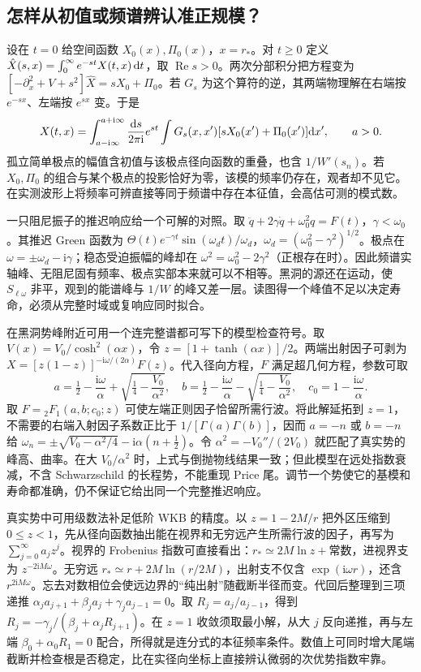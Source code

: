 \subsection{怎样从初值或频谱辨认准正规模？}

设在 $t=0$ 给空间函数 $X_0(x),\Pi_0(x)$，$x=r_*$。对 $t\ge0$ 定义 $\hat X(s,x)=\int_0^\infty e^{-st}X(t,x)\,\dd t$，取 $\operatorname{Re}s>0$。两次分部积分把方程变为 $[-\partial_x^2+V+s^2]\hat X=sX_0+\Pi_0$。若 $G_s$ 为这个算符的逆，其两端物理解在右端按 $e^{-s x}$、左端按 $e^{s x}$ 变。于是
\[
 X(t,x)=\int_{a-\mathrm i\infty}^{a+\mathrm i\infty}
 \frac{\dd s}{2\pi\mathrm i}e^{st}
 \int G_s(x,x')[sX_0(x')+\Pi_0(x')]\dd x',\qquad a>0 .
\]
孤立简单极点的幅值含初值与该极点径向函数的重叠，也含 $1/W'(s_n)$。若 $X_0,\Pi_0$ 的组合与某个极点的投影恰好为零，该模的频率仍存在，观者却不见它。在实测波形上将频率可辨直接等同于频谱中存在本征值，会高估可测的模式数。

一只阻尼振子的推迟响应给一个可解的对照。取 $\ddot q+2\gamma\dot q+\omega_0^2 q=F(t)$，$\gamma<\omega_0$。其推迟 Green 函数为 $\Theta(t)e^{-\gamma t}\sin(\omega_d t)/\omega_d$，$\omega_d=(\omega_0^2-\gamma^2)^{1/2}$。极点在 $\omega=\pm\omega_d-\mathrm i\gamma$；稳态受迫振幅的峰却在 $\omega^2=\omega_0^2-2\gamma^2$（正根存在时）。因此频谱实轴峰、无阻尼固有频率、极点实部本来就可以不相等。黑洞的源还在运动，使 $S_{\ell\omega}$ 非平，观到的能谱峰与 $1/W$ 的峰又差一层。读图得一个峰值不足以决定寿命，必须从完整时域或复响应同时拟合。

在黑洞势峰附近可用一个连完整谱都可写下的模型检查符号。取 $V(x)=V_0/\cosh^2(\alpha x)$，令 $z=[1+\tanh(\alpha x)]/2$。两端出射因子可剥为 $X=[z(1-z)]^{-\mathrm i\omega/(2\alpha)}F(z)$。代入径向方程，$F$ 满足超几何方程，参数可取
\[
 a=\tfrac12-\frac{\mathrm i\omega}{\alpha}
               +\sqrt{\tfrac14-\frac{V_0}{\alpha^2}},\quad
 b=\tfrac12-\frac{\mathrm i\omega}{\alpha}
               -\sqrt{\tfrac14-\frac{V_0}{\alpha^2}},\quad
 c_0=1-\frac{\mathrm i\omega}{\alpha}.
\]
取 $F={}_2F_1(a,b;c_0;z)$ 可使左端正则因子恰留所需行波。将此解延拓到 $z=1$，不需要的右端入射因子系数正比于 $1/[\Gamma(a)\Gamma(b)]$，因而 $a=-n$ 或 $b=-n$ 给 $\omega_n=\pm\sqrt{V_0-\alpha^2/4}-\mathrm i\alpha(n+\tfrac12)$。令 $\alpha^2=-V_0''/(2V_0)$ 就匹配了真实势的峰高、曲率。在大 $V_0/\alpha^2$ 时，上式与倒抛物线结果一致；但此模型在远处指数衰减，不含 Schwarzschild 的长程势，不能重现 Price 尾。调节一个势使它的基模和寿命都准确，仍不保证它给出同一个完整推迟响应。

真实势中可用级数法补足低阶 WKB 的精度。以 $z=1-2M/r$ 把外区压缩到 $0\le z<1$，先从径向函数抽出能在视界和无穷远产生所需行波的因子，再写为 $\sum_{j=0}^\infty a_j z^j$。视界的 Frobenius 指数可直接看出：$r_*\simeq2M\ln z+\text{常数}$，进视界支为 $z^{-2\mathrm i M\omega}$。无穷远 $r_*\simeq r+2M\ln(r/2M)$，出射支不仅含 $\exp(\mathrm i\omega r)$，还含 $r^{2\mathrm iM\omega}$。忘去对数相位会使远边界的“纯出射”随截断半径而变。代回后整理到三项递推 $\alpha_j a_{j+1}+\beta_j a_j+\gamma_j a_{j-1}=0$。取 $R_j=a_j/a_{j-1}$，得到 $R_j=-\gamma_j/(\beta_j+\alpha_jR_{j+1})$。在 $z=1$ 收敛须取最小解，从大 $j$ 反向递推，再与左端 $\beta_0+\alpha_0R_1=0$ 配合，所得就是连分式的本征频率条件。数值上可同时增大尾端截断并检查根是否稳定，比在实径向坐标上直接辨认微弱的次优势指数牢靠。

